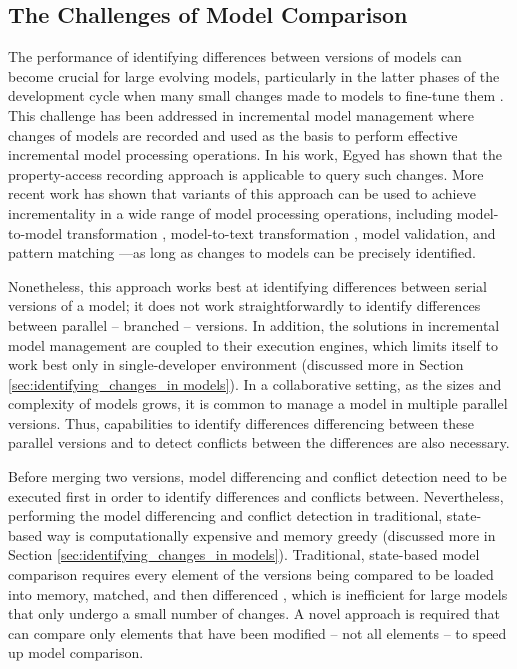 \subsection{The Challenges of Model Comparison}
\label{sec:the_key_challenge_of_incrementality}

The performance of identifying differences between versions of models can become crucial for large evolving models, particularly in the latter phases of the development cycle when many small changes made to models to fine-tune them \cite{selic2003pragmatics}. This challenge has been addressed in incremental model management where changes of models are recorded and used as the basis to perform effective incremental model processing operations. In his work, Egyed \cite{egyed2011automatically} has shown that the property-access recording approach is applicable to query such changes. More recent work has shown that variants of this approach can be used to achieve incrementality in a wide range of model processing operations, including model-to-model transformation \cite{jouault2010towards}, model-to-text transformation \cite{DBLP:conf/ecmdafa/OgunyomiRK15}, model validation, and pattern matching \cite{DBLP:conf/ecmdafa/RathHV12}---as long as changes to models can be precisely identified.  

Nonetheless, this approach works best at identifying differences between serial versions of a model; it does not work straightforwardly to identify differences between parallel -- branched -- versions. In addition, the solutions in incremental model management are coupled to their execution engines, which limits itself to work best only in single-developer environment (discussed more in Section \ref{sec:identifying_changes_in models}). In a collaborative setting, as the sizes and complexity of models grows, it is common to manage a model in multiple parallel versions. Thus, capabilities to identify differences differencing between these parallel versions and to detect conflicts between the differences are also necessary.

Before merging two versions, model differencing and conflict detection need to be executed first in order to identify differences and conflicts between. Nevertheless, performing the model differencing and conflict detection in traditional, state-based way is computationally expensive and memory greedy (discussed more in Section \ref{sec:identifying_changes_in models}). Traditional, state-based model comparison requires every element of the versions being compared to be loaded into memory, matched, and then differenced \cite{emfcompare2018developer}, which is inefficient for large models that only undergo a small number of changes. A novel approach is required that can compare only elements that have been modified -- not all elements -- to speed up model comparison.

